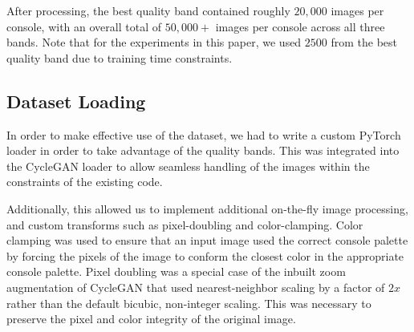 \documentclass[10pt,twocolumn,letterpaper]{article}
\begin{document}
After processing, the best quality band contained roughly $20,000$ images per console, with an overall total of $50,000+$ images per console across all three bands. Note that for the experiments in this paper, we used $2500$ from the best quality band due to training time constraints.

\subsection{Dataset Loading}
In order to make effective use of the dataset, we had to write a custom PyTorch loader in order to take advantage of the quality bands. This was integrated into the CycleGAN loader to allow seamless handling of the images within the constraints of the existing code.

Additionally, this allowed us to implement additional on-the-fly image processing, and custom transforms such as pixel-doubling and color-clamping. Color clamping was used to ensure that an input image used the correct console palette by forcing the pixels of the image to conform the closest color in the appropriate console palette.
Pixel doubling was a special case of the inbuilt zoom augmentation of CycleGAN that used nearest-neighbor scaling by a factor of $2x$ rather than the default bicubic, non-integer scaling. This was necessary to preserve the pixel and color integrity of the original image.
\end{document}
